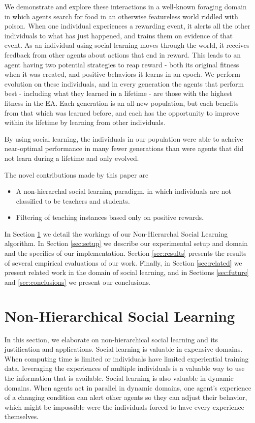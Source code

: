 \documentclass{acm_proc_article-sp}
\begin{document}
We demonstrate and explore these interactions in a well-known foraging domain in which agents search for food in an otherwise featureless world riddled with poison.  When one individual experiences a rewarding event, it alerts all the other individuals to what has just happened, and trains them on evidence of that event.
As an individual using social learning moves through the world, it receives feedback from other agents about actions that end in reward.  This leads to an agent having two potential strategies to reap reward - both its original fitness when it was created, and positive behaviors it learns in an epoch.
We perform evolution on these individuals, and in every generation the agents that perform best - including what they learned in a lifetime - are those with the highest fitness in the EA.  
Each generation is an all-new population, but each benefits from that which was learned before, and each has the opportunity to improve within its lifetime by learning from other individuals.
    
By using social learning, the individuals in our population were able to acheive near-optimal performance in many fewer generations than were agents that did not learn during a lifetime and only evolved.

The novel contributions made by this paper are 
\begin{itemize}
\item A non-hierarchal social learning paradigm, in which individuals are not classified to be teachers and students.
\item Filtering of teaching instances based only on positive rewards. 
\end{itemize}
 
 In Section \ref{sec:nhsl} we detail the workings of our Non-Hierarchal Social Learning algorithm.
In Section \ref{sec:setup} we describe our experimental setup and domain and the specifics of our implementation.
Section \ref{sec:results} presents the results of several empirical evaluations of our work.
Finally, in Section \ref{sec:related} we present related work in the domain of social learning, and in Sections \ref{sec:future} and \ref{sec:conclusions} we present our conclusions.

\section{Non-Hierarchical Social Learning}
\label{sec:nhsl}
In this section, we elaborate on non-hierarchical social learning and its justification and applications.
Social learning is valuable in expensive domains.  When computing time is limited or individuals have limited experiential training data, leveraging the experiences of multiple individuals is a valuable way to use the information that is available.
Social learning is also valuable in dynamic domains. 
When agents act in parallel in dynamic domains, one agent's experience of a changing condition can alert other agents so they can adjust their behavior, which might be impossible were the individuals forced to have every experience themselves.
\end{document}

